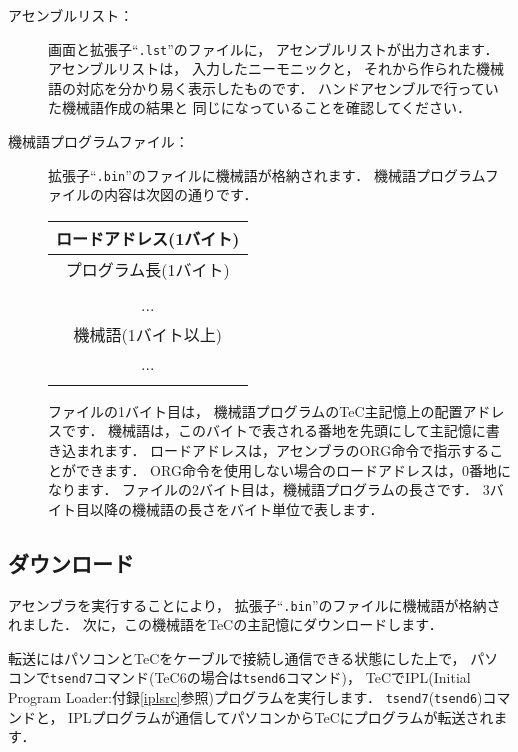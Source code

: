 \begin{description}
\item [アセンブルリスト：]
画面と拡張子``{\tt .lst}''のファイルに，
アセンブルリストが出力されます．
アセンブルリストは，
入力したニーモニックと，
それから作られた機械語の対応を分かり易く表示したものです．
ハンドアセンブルで行っていた機械語作成の結果と
同じになっていることを確認してください．

\item [機械語プログラムファイル：]
拡張子``{\tt .bin}''のファイルに機械語が格納されます．
機械語プログラムファイルの内容は次図の通りです．

\begin{center}
{\small
\begin{tabular}{|c|}
\hline
ロードアドレス(1バイト) \\
\hline
プログラム長(1バイト) \\
\hline
\\
...\\
機械語(1バイト以上) \\
...\\
\\
\hline
\end{tabular}
}
\end{center}

ファイルの1バイト目は，
機械語プログラムのTeC主記憶上の配置アドレスです．
機械語は，このバイトで表される番地を先頭にして主記憶に書き込まれます．
ロードアドレスは，アセンブラのORG命令で指示することができます．
ORG命令を使用しない場合のロードアドレスは，0番地になります．
ファイルの2バイト目は，機械語プログラムの長さです．
3バイト目以降の機械語の長さをバイト単位で表します．
\end{description}

\subsection{ダウンロード}

アセンブラを実行することにより，
拡張子``{\tt .bin}''のファイルに機械語が格納されました．
次に，この機械語をTeCの主記憶にダウンロードします．

転送にはパソコンとTeCをケーブルで接続し通信できる状態にした上で，
パソコンで{\tt tsend7}コマンド(TeC6の場合は{\tt tsend6}コマンド)，
TeCでIPL(Initial Program Loader:付録\ref{iplsrc}参照)プログラムを実行します．
{\tt tsend7}({\tt tsend6})コマンドと，
IPLプログラムが通信してパソコンからTeCにプログラムが転送されます．

